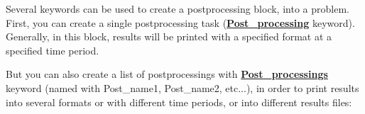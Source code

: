 Several keywords can be used to create a postprocessing block, into a problem. First, you can create a single postprocessing task (\href{\REFERENCEMANUAL\#postraitement}{\textbf{Post\_processing}} keyword). Generally, in this block, results will be printed with a specified format at a specified time period.
\begin{center}
\end{center}

But you can also create a list of postprocessings with \href{\REFERENCEMANUAL\#postraitements}{\textbf{Post\_processings}} keyword (named with Post\_name1, Post\_name2, etc...), in order to print results into several formats or with different time periods, or into different results files:
\begin{center}
\end{center}




